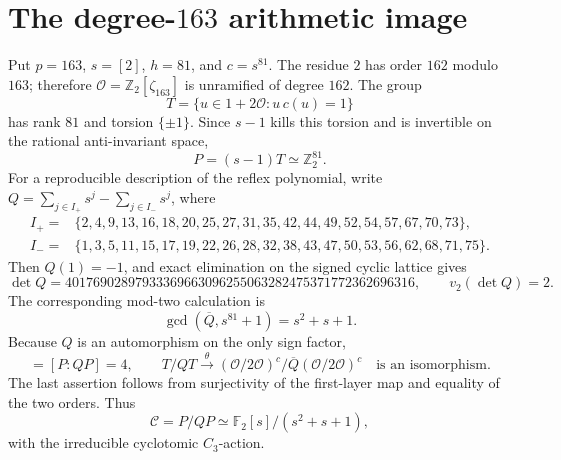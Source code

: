 \section{The degree-\(163\) arithmetic image}
\label{sec:arithmetic-cm-163}

Put \(p=163\), \(s=[2]\), \(h=81\), and \(c=s^{81}\).
The residue \(2\) has order \(162\) modulo \(163\);
therefore
\(\mathcal O=\mathbb Z_2[\zeta_{163}]\) is unramified of
degree \(162\). The group
\[
 T=\{u\in1+2\mathcal O:u\,c(u)=1\}
\]
has rank \(81\) and torsion \(\{\pm1\}\).
Since \(s-1\) kills this torsion and is invertible on the
rational anti-invariant space,
\[
 P=(s-1)T\simeq\mathbb Z_2^{81}.
\]
For a reproducible description of the reflex polynomial,
write \(Q=\sum_{j\in I_+}s^j-\sum_{j\in I_-}s^j\), where
\[
\begin{split}
 I_+={}&\{2,4,9,13,16,18,20,25,27,31,35,42,44,49,
                                     52,54,57,67,70,73\},\\
 I_-={}&\{1,3,5,11,15,17,19,22,26,28,32,38,43,47,50,
                                  53,56,62,68,71,75\}.
\end{split}
\]
Then \(Q(1)=-1\), and exact elimination on the signed
cyclic lattice gives
\[
 \det Q=40176902897933369663096255063282475371772362696316,
 \qquad v_2(\det Q)=2.
\]
The corresponding mod-two calculation is
\[
 \gcd(\overline Q,s^{81}+1)=s^2+s+1.
\]
Because \(Q\) is an automorphism on the only sign factor,
\begin{equation}
 [T:QT]=[P:QP]=4,\qquad
 T/QT\xrightarrow{\ \theta\ }
      (\mathcal O/2\mathcal O)^c/\overline Q
                       (\mathcal O/2\mathcal O)^c
 \quad\text{is an isomorphism}.
 \label{eq:163-first-layer}
\end{equation}
The last assertion follows from surjectivity of the
first-layer map and equality of the two orders.
Thus
\[
 \mathscr C=P/QP\simeq
     \mathbb F_2[s]/(s^2+s+1),
\]
with the irreducible cyclotomic \(C_3\)-action.

